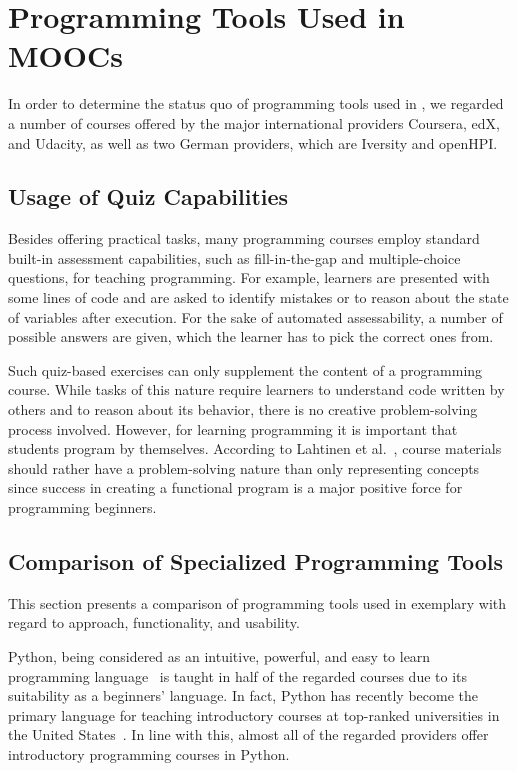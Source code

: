 \section{Programming Tools Used in MOOCs}\label{section:competition}

In order to determine the status quo of programming tools used in \moocs, we regarded a number of courses offered by the major international \mooc providers Coursera, edX, and Udacity, as well as two German \mooc providers, which are Iversity and openHPI.

\subsection{Usage of Quiz Capabilities}

Besides offering practical tasks, many programming courses employ standard built-in assessment capabilities, such as fill-in-the-gap and multiple-choice questions, for teaching programming. For example, learners are presented with some lines of code and are asked to identify mistakes or to reason about the state of variables after execution. For the sake of automated assessability, a number of possible answers are given, which the learner has to pick the correct ones from.

Such quiz-based exercises can only supplement the content of a programming course. While tasks of this nature require learners to understand code written by others and to reason about its behavior, there is no creative problem-solving process involved. However, for learning programming it is important that students program by themselves. According to Lahtinen et al.~\cite{lahtinen2005study}, course materials should rather have a problem-solving nature than only representing concepts since success in creating a functional program is a major positive force for programming beginners.

\subsection{Comparison of Specialized Programming Tools}

This section presents a comparison of programming tools used in exemplary \moocs with regard to approach, functionality, and usability.

Python, being considered as an intuitive, powerful, and easy to learn programming language~\cite{blank2006robots} is taught in half of the regarded courses due to its suitability as a beginners' language. In fact, Python has recently become the primary language for teaching introductory \cs courses at top-ranked universities in the United States~\cite{guo2014python}. In line with this, almost all of the regarded \mooc providers offer introductory programming courses in Python.

